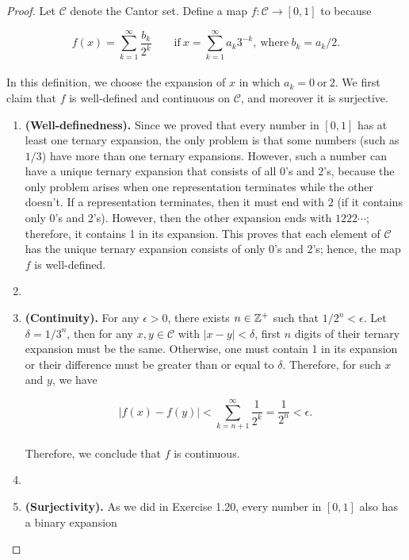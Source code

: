 \documentclass[12pt, a4paper, openany, twoside]{book}
\theoremstyle{definition}
\theoremstyle{remark}
\theoremstyle{plain}
\numberwithin{equation}{section}
\begin{document}
\begin{proof}
    Let $$ denote the Cantor set. Define a map $f:\rightarrow [0,1]$ to because
    
    \[f(x)=\sum_{k=1}^{\infty}{\frac{b_k}{2^k}}\qquad\text{if}\ x=\sum_{k=1}^{\infty}{a_k3^{-k}},\ \text{where}\ b_k=a_k/2.\]
    \\
    In this definition, we choose the expansion of $x$ in which $a_k=0\ \ 2$. We first claim that $f$ is well-defined and continuous on $$, and moreover it is surjective.
    \vspace{5mm}
    \begin{enumerate}
        \item []\textbf{(Well-definedness).} Since we proved that every number in $[0,1]$ has at least one ternary expansion, the only problem is that some numbers (such as $1/3$) have more than one ternary expansions. However, such a number can have a unique ternary expansion that consists of all 0's and 2's, because the only problem arises when one representation terminates while the other doesn't. If a representation terminates, then it must end with $2$ (if it contains only 0's and 2's). However, then the other expansion ends with $1222\cdots$; therefore, it contains 1 in its expansion. This proves that each element of $$ has the unique ternary expansion consists of only 0's and 2's; hence, the map $f$ is well-defined.
        \item []
        \item []\textbf{(Continuity).} For any $\epsilon>0$, there exists $n\in\BZ^+$ such that $1/2^n<\epsilon$. Let $/3^n$, then for any $x,y\in{}$ with $|x-y|<\delta$, first $n$ digits of their ternary expansion must be the same. Otherwise, one must contain 1 in its expansion or their difference must be greater than or equal to $\delta$. Therefore, for such $x$ and $y$, we have
        
        \[|f(x)-f(y)|<\sum_{k=n+1}^{\infty}{\frac{1}{2^k}}=\frac{1}{2^n}<\epsilon.\]
        \\
        Therefore, we conclude that $f$ is continuous.
        \item []
        \item []\textbf{(Surjectivity).} As we did in Exercise 1.20, every number in $[0,1]$ also has a binary expansion
        

\end{enumerate}
\end{proof}
\end{document}
